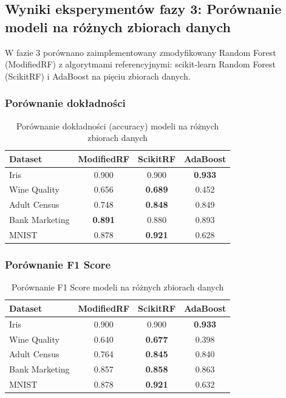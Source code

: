 \documentclass[11pt,a4paper]{article}
\begin{document}
\subsection{Wyniki eksperymentów fazy 3: Porównanie modeli na różnych zbiorach danych}

W fazie 3 porównano zaimplementowany zmodyfikowany Random Forest (ModifiedRF) z algorytmami referencyjnymi: scikit-learn Random Forest (ScikitRF) i AdaBoost na pięciu zbiorach danych.

\subsubsection{Porównanie dokładności}

\begin{table}[H]
\centering
\caption{Porównanie dokładności (accuracy) modeli na różnych zbiorach danych}
\label{tab:accuracy_comparison}
\begin{tabular}{lccc}
\toprule
Dataset & ModifiedRF & ScikitRF & AdaBoost \\
\midrule
Iris & 0.900 & 0.900 & \textbf{0.933} \\
Wine Quality & 0.656 & \textbf{0.689} & 0.452 \\
Adult Census & 0.748 & \textbf{0.848} & 0.849 \\
Bank Marketing & \textbf{0.891} & 0.880 & 0.893 \\
MNIST & 0.878 & \textbf{0.921} & 0.628 \\
\bottomrule
\end{tabular}
\end{table}

\subsubsection{Porównanie F1 Score}

\begin{table}[H]
\centering
\caption{Porównanie F1 Score modeli na różnych zbiorach danych}
\label{tab:f1_comparison}
\begin{tabular}{lccc}
\toprule
Dataset & ModifiedRF & ScikitRF & AdaBoost \\
\midrule
Iris & 0.900 & 0.900 & \textbf{0.933} \\
Wine Quality & 0.640 & \textbf{0.677} & 0.398 \\
Adult Census & 0.764 & \textbf{0.845} & 0.840 \\
Bank Marketing & 0.857 & \textbf{0.858} & 0.863 \\
MNIST & 0.878 & \textbf{0.921} & 0.632 \\
\bottomrule
\end{tabular}
\end{table}
\end{document}
